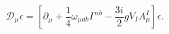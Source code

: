 \begin{equation}
\mathcal{D}_{\mu }\epsilon =\left[ \partial _{\mu }+\frac{1}{4}\omega _{\mu
ab}\Gamma ^{ab}-{\frac{3i}{2}}gV_{I}A_{\mu }^{I}\right] \epsilon .
\end{equation}

